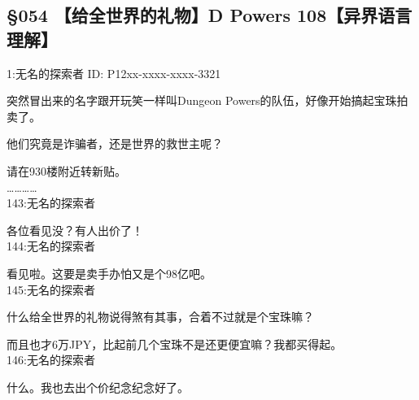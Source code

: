 \subsection{§054 【给全世界的礼物】D Powers 108【异界语言理解】}

1:无名的探索者 ID: P12xx-xxxx-xxxx-3321

突然冒出来的名字跟开玩笑一样叫Dungeon Powers的队伍，好像开始搞起宝珠拍卖了。

他们究竟是诈骗者，还是世界的救世主呢？

请在930楼附近转新贴。\\

…………\\

143:无名的探索者

各位看见没？有人出价了！\\

144:无名的探索者

看见啦。这要是卖手办怕又是个98亿吧。\\

145:无名的探索者

什么给全世界的礼物说得煞有其事，合着不过就是个宝珠嘛？

而且也才6万JPY，比起前几个宝珠不是还更便宜嘛？我都买得起。\\

146:无名的探索者

什么。我也去出个价纪念纪念好了。\\

